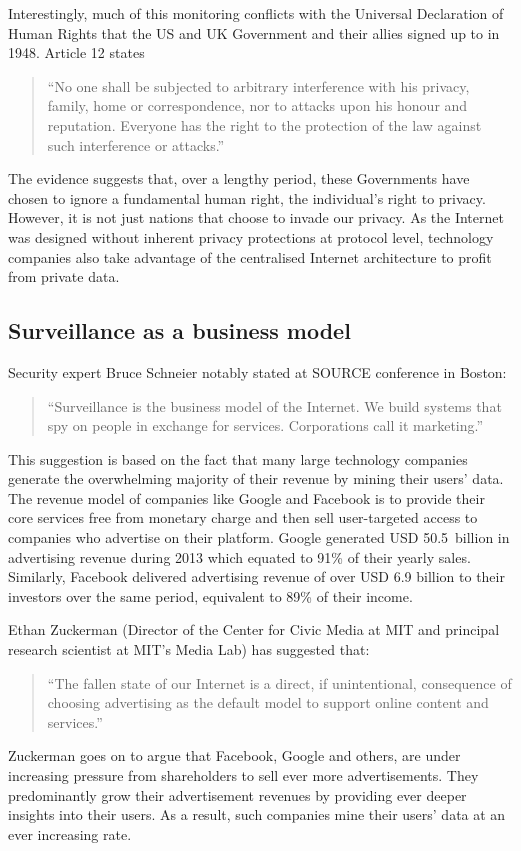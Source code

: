 \documentclass[twocolumn,english]{article}
\begin{document}
Interestingly, much of this monitoring conflicts with the Universal
Declaration of Human Rights that the US and UK Government and their
allies signed up to in 1948. Article 12 states\cite{unhrd12}
\begin{quote}
\textquotedblleft No one shall be subjected to arbitrary interference
with his privacy, family, home or correspondence, nor to attacks upon
his honour and reputation. Everyone has the right to the protection
of the law against such interference or attacks.\textquotedblright
\end{quote}
The evidence suggests that, over a lengthy period, these Governments
have chosen to ignore a fundamental human right, the individual's right
to privacy. However, it is not just nations that choose to invade
our privacy.  As the Internet was designed without inherent privacy protections at protocol level, technology companies also take advantage of the centralised Internet architecture to profit from private data.

\subsection{Surveillance as a business model }

Security expert Bruce Schneier notably stated at SOURCE conference in Boston:\cite{boston14}
\begin{quote}
\textquotedblleft Surveillance is the business model of the Internet. We build systems that spy on people in exchange for services. Corporations call it marketing.\textquotedblright
\end{quote}
This suggestion is based on the fact that many large technology
companies generate the overwhelming majority of their revenue by
mining their users' data. The revenue model of companies like Google
and Facebook is to provide their core services free from monetary
charge and then sell user-targeted access to companies who advertise on their platform. Google generated USD 50.5~billion in advertising
revenue during 2013 which equated to 91\% of their yearly sales\cite{google13}. Similarly, Facebook delivered advertising revenue of over USD 6.9
billion to their investors over the same period, equivalent to 89\%
of their income\cite{facebook13}. 

Ethan Zuckerman (Director of the Center for Civic Media at MIT and
principal research scientist at MIT\textquoteright s Media Lab) has
suggested that\cite{zuckerman14}:
\begin{quote}
\textquotedblleft The fallen state of our Internet is a direct, if
unintentional, consequence of choosing advertising as the default
model to support online content and services.\textquotedblright 
\end{quote}
Zuckerman goes on to argue that Facebook, Google and others, are under
increasing pressure from shareholders to sell ever more advertisements.
They predominantly grow their advertisement revenues by providing ever deeper insights into their users.  As a result, such companies mine their users' data at an ever increasing rate.
\end{document}
